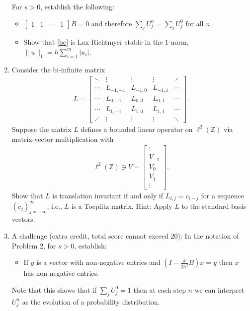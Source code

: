 \documentclass[10pt]{amsart}
\begin{document}
\begin{enumerate}[label={\bf Problem~{\arabic*}:}]
  
      \noindent For $s > 0$, establish the following:
       \begin{itemize}
       \item $\begin{bmatrix} 1 & 1 & \cdots & 1 \end{bmatrix} B = 0$ and therefore $\sum_j U_j^n = \sum_j U_j^0$ for all $n$.
         \item  Show that \eqref{be} is Lax-Richtmyer stable in the $1$-norm, $\|u\|_1 = h \sum_{i=1}^m |u_i|$.
    \end{itemize}
     
    \mline
    \item Consider the bi-infinite matrix
    \begin{align*}
      L = \begin{bmatrix}
        \ddots & \vdots & \vdots & \vdots  & \iddots \\
        \cdots & L_{-1,-1} & L_{-1,0} & L_{-1,1} & \cdots \\
        \cdots & L_{0,-1} & L_{0,0} & L_{0,1} & \cdots \\
        \cdots & L_{1,-1} & L_{1,0} & L_{1,1} & \cdots \\
        \iddots & \vdots & \vdots & \vdots & \ddots
      \end{bmatrix}.                
    \end{align*}
    Suppose the matrix $L$ defines a bounded linear operator on $\ell^2(\mathbb Z)$ via matrix-vector multiplication with
    \begin{align*}
     \ell^2(\mathbb Z) \ni V = \begin{bmatrix} \vdots \\ V_{-1} \\ V_0 \\ V_1 \\\vdots \end{bmatrix}.
    \end{align*}
    Show that $L$ is translation invariant if and only if $L_{i,j} = c_{i - j}$ for a sequence $(c_j)_{j=-\infty}^\infty$, i.e., $L$ is a Toeplitz matrix.  Hint: Apply $L$ to the standard basis vectors.

    
\mline 
  
\item A challenge (extra credit, total score cannot exceed 20):  In the notation of Problem 2, for $s > 0$, establish:
  \begin{itemize}
  \item If $y$ is a vector with non-negative entries and $\left( I - \frac{k}{2h^2}B \right) x = y$ then $x$ has non-negative entries.
  \end{itemize}
  Note that this shows that if $\sum_j U_j^0 =1$ then at each step $n$ we can interpret $U_j^n$ as the evolution of a probability distribution.
    

\end{enumerate}
\end{document}
